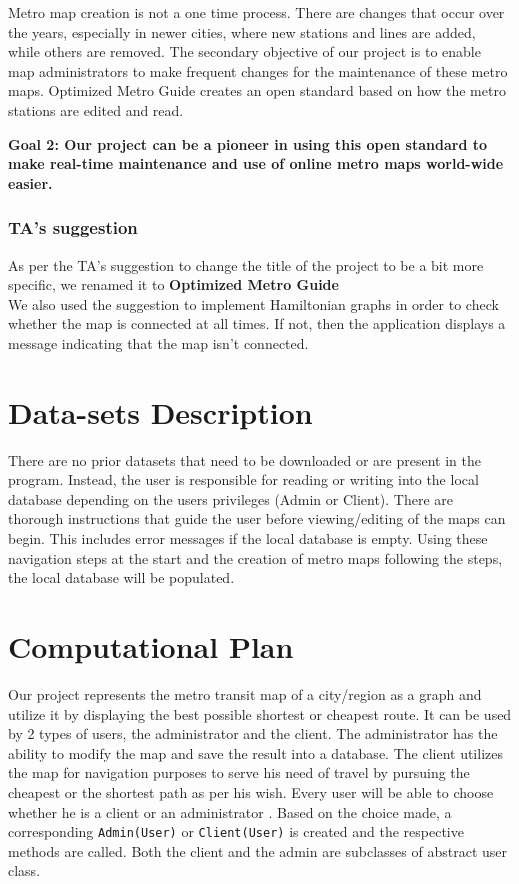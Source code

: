 \documentclass[fontsize=11pt]{article}
\begin{document}
    Metro map creation is not a one time process. There are changes that occur over the years, especially in newer cities, where new stations and lines are added, while others are removed. The secondary objective of our project is to enable map administrators to make frequent changes for the maintenance of these metro maps. Optimized Metro Guide creates an open standard based on how the metro stations are edited and read.\newline


    \textbf{Goal 2:
    Our project can be a pioneer in using this open standard to make real-time maintenance and use of online metro maps world-wide easier.
    }\newline

    \subsubsection*{TA's suggestion}
    As per the TA's suggestion to change the title of the project to be a bit more specific, we renamed it to
    \textbf{Optimized Metro Guide}\\
    We also used the suggestion to implement Hamiltonian graphs in order to check whether the map is connected at all times. If not, then the application displays a message indicating that the map isn't connected.
    \section*{Data-sets Description}
    There are no prior datasets that need to be downloaded or are present in the program. Instead, the user is responsible for reading or writing into the local database depending on the users privileges (Admin or Client). There are thorough instructions that guide the user before viewing/editing of the maps can begin. This includes error messages if the local database is empty. Using these navigation steps at the start and the creation of metro maps following the steps, the local database will be populated.

    \section*{Computational Plan}
    Our project represents the metro transit map of a city/region as a graph and utilize it by displaying the best possible shortest or cheapest route. It can be used by 2 types of users, the administrator and the client. The administrator has the ability to modify the map and save the result into a database. The client utilizes the map for navigation purposes to serve his need of travel by pursuing the cheapest or the shortest path as per his wish. Every user will be able to choose whether he is a client or an administrator . Based on the choice made, a corresponding \texttt{Admin(User)} or \texttt{Client(User)} is created and the respective methods are called. Both the client and the admin are subclasses of abstract user class.
\end{document}
